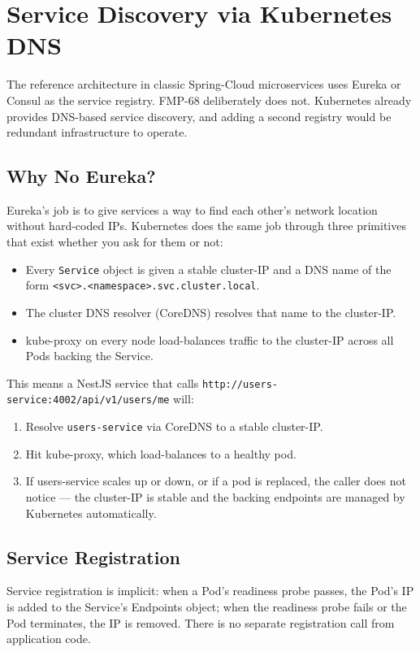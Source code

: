 \documentclass[11pt,a4paper]{article}
\begin{document}
\section{Service Discovery via Kubernetes DNS}

The reference architecture in classic Spring-Cloud microservices uses
Eureka or Consul as the service registry.  FMP-68 deliberately does
not.  Kubernetes already provides DNS-based service discovery, and
adding a second registry would be redundant infrastructure to operate.

\subsection{Why No Eureka?}
Eureka's job is to give services a way to find each other's network
location without hard-coded IPs.  Kubernetes does the same job
through three primitives that exist whether you ask for them or not:

\begin{itemize}[leftmargin=*]
  \item Every \texttt{Service} object is given a stable cluster-IP and
        a DNS name of the form
        \texttt{<svc>.<namespace>.svc.cluster.local}.
  \item The cluster DNS resolver (CoreDNS) resolves that name to the
        cluster-IP.
  \item kube-proxy on every node load-balances traffic to the
        cluster-IP across all Pods backing the Service.
\end{itemize}

This means a NestJS service that calls
\texttt{http://users-service:4002/api/v1/users/me} will:

\begin{enumerate}[leftmargin=*]
  \item Resolve \texttt{users-service} via CoreDNS to a stable
        cluster-IP.
  \item Hit kube-proxy, which load-balances to a healthy pod.
  \item If users-service scales up or down, or if a pod is replaced,
        the caller does not notice — the cluster-IP is stable and the
        backing endpoints are managed by Kubernetes automatically.
\end{enumerate}

\subsection{Service Registration}
Service registration is implicit: when a Pod's readiness probe
passes, the Pod's IP is added to the Service's Endpoints object; when
the readiness probe fails or the Pod terminates, the IP is removed.
There is no separate registration call from application code.
\end{document}
